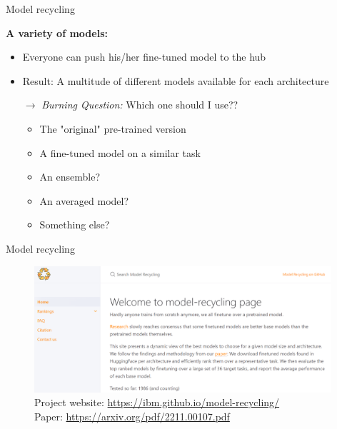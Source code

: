 
\begin{frame}{Model recycling}

\vfill

\textbf{A variety of models:}

\begin{itemize}
	\item Everyone can push his/her fine-tuned model to the hub
 	\item Result: A multitude of different models available for each architecture
	\item[$\to$] \textit{Burning Question:} Which one should I use??
		\begin{itemize}
			\item The "original" pre-trained version
			\item A fine-tuned model on a similar task
			\item An ensemble?
			\item An averaged model?
			\item Something else?
		\end{itemize}
\end{itemize}

\vfill

\end{frame}


\begin{frame}{Model recycling}

\vfill

	\begin{figure}
		\centering
		\includegraphics[width = 11cm]{figure/model-recycling.png}\\
		
		Project website: \url{https://ibm.github.io/model-recycling/}\\
		
		Paper: \url{https://arxiv.org/pdf/2211.00107.pdf}
	\end{figure}
	
\vfill

\end{frame}

